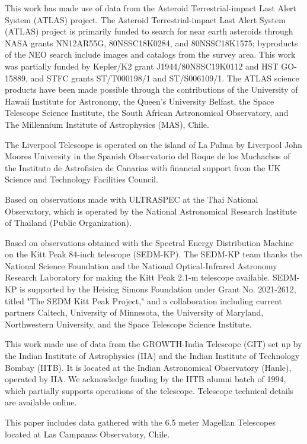 \documentclass{nature_plusfigure}
\begin{document}
\begin{addendum}
This work has made use of data from the Asteroid Terrestrial-impact Last Alert System (ATLAS) project. The Asteroid Terrestrial-impact Last Alert System (ATLAS) project is primarily funded to search for near earth asteroids through NASA grants NN12AR55G, 80NSSC18K0284, and 80NSSC18K1575; byproducts of the NEO search include images and catalogs from the survey area. This work was partially funded by Kepler/K2 grant J1944/80NSSC19K0112 and HST GO-15889, and STFC grants ST/T000198/1 and ST/S006109/1. The ATLAS science products have been made possible through the contributions of the University of Hawaii Institute for Astronomy, the Queen’s University Belfast, the Space Telescope Science Institute, the South African Astronomical Observatory, and The Millennium Institute of Astrophysics (MAS), Chile.

The Liverpool Telescope is operated on the island of La Palma by Liverpool John Moores University in the Spanish Observatorio del Roque de los Muchachos of the Instituto de Astrofisica de Canarias with financial support from the UK Science and Technology Facilities Council.

Based on observations made with ULTRASPEC at the Thai National Observatory, which is operated by the National Astronomical Research Institute of Thailand (Public Organization).

Based on observations obtained with the Spectral Energy Distribution
Machine on the Kitt Peak 84-inch telescope (SEDM-KP). The SEDM-KP team
thanks the National Science Foundation and the National
Optical-Infrared Astronomy Research Laboratory for making the Kitt
Peak 2.1-m telescope available. SEDM-KP is supported by the Heising
Simons Foundation under Grant No. 2021-2612, titled "The SEDM Kitt
Peak Project,"
and a collaboration including current partners Caltech, University of
Minnesota, the
University of Maryland, Northwestern University, and the Space
Telescope Science Institute.

This work made use of data from the GROWTH-India Telescope (GIT) set up by the Indian Institute of Astrophysics (IIA) and the Indian Institute of Technology Bombay (IITB). It is located at the Indian Astronomical Observatory (Hanle), operated by IIA. We acknowledge funding by the IITB alumni batch of 1994, which partially supports operations of the telescope. Telescope technical details are available online.\cite{growth_india}

This paper includes data gathered with the 6.5 meter Magellan Telescopes located at Las Campanas Observatory, Chile.


\end{addendum}
\end{document}
